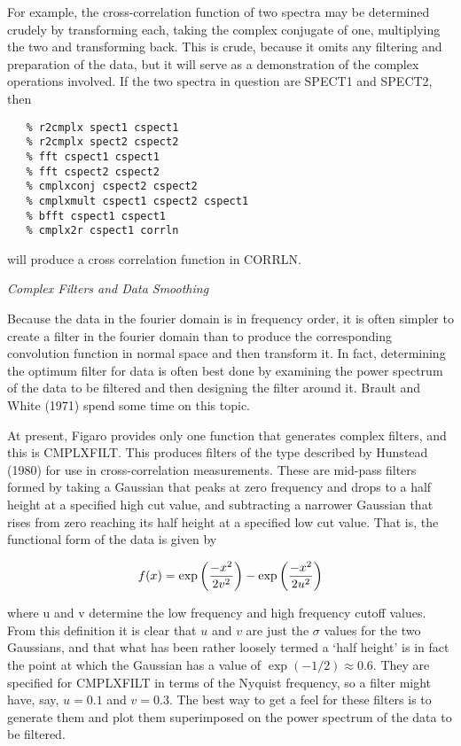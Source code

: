 For example, the cross-correlation function of two spectra may be
determined crudely by transforming each, taking the complex conjugate of
one, multiplying the two and transforming back.  This is crude, because it
omits any filtering and preparation of the data, but it will serve 
as a demonstration of the complex operations involved.  If the two spectra
in question are SPECT1 and SPECT2, then

\goodbreak
\begin{verbatim}
   % r2cmplx spect1 cspect1
   % r2cmplx spect2 cspect2
   % fft cspect1 cspect1
   % fft cspect2 cspect2
   % cmplxconj cspect2 cspect2
   % cmplxmult cspect1 cspect2 cspect1
   % bfft cspect1 cspect1
   % cmplx2r cspect1 corrln
\end{verbatim}
\goodbreak

will produce a cross correlation function in CORRLN.


\goodbreak
\vspace{12pt}
{\it Complex Filters and Data Smoothing}

Because the data in the fourier domain is in frequency order, it is
often simpler to create a filter in the fourier domain than to produce
the corresponding convolution function in normal space and then transform
it.  In fact, determining the optimum filter for data is often best done
by examining the power spectrum of the data to be filtered and then
designing the filter around it.  Brault and White (1971) spend some time
on this topic.

At present, Figaro provides only one function that generates complex
filters, and this is CMPLXFILT.  This produces filters of the type described
by Hunstead (1980) for use in cross-correlation measurements.  These are
mid-pass filters formed by taking a Gaussian that peaks at zero frequency
and drops to a half height at a specified high cut value, and subtracting
a narrower Gaussian that rises from zero reaching its half height at a
specified low cut value.  That is, the functional form of the data is
given by

$$f(x) = \exp{\left({{-x^2}\over{2 v^2}}\right)}
       - \exp{\left({{-x^2}\over{2 u^2}}\right)}$$

where u and v determine the low frequency and high frequency cutoff values.
From this definition it is clear that $u$ and $v$ are just the $\sigma$
values for
the two Gaussians, and that what has been rather loosely termed a `half height'
is in fact the point at which the Gaussian has a value of
$\exp(-1/2)\approx 0.6$.
They are specified for CMPLXFILT in terms of the Nyquist frequency, so a
filter might have, say, $u=0.1$ and $v=0.3$.
The best way to get a feel for these filters is to generate them and plot
them superimposed on the power spectrum of the data to be filtered.

